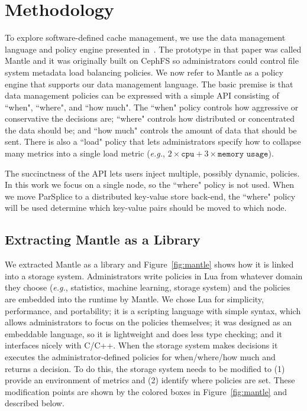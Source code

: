 \section{Methodology}

To explore software-defined cache management, we use the data management
language and policy engine presented in~\cite{sevilla:sc15-mantle}. The
prototype in that paper was called Mantle and it was originally built on CephFS
so administrators could control file system metadata load balancing policies.
We now refer to Mantle as a policy engine that supports our data management
language.  The basic premise is that data management policies can be expressed
with a simple API consisting of ``when", ``where", and ``how much". The ``when" policy
controls how aggressive or conservative the decisions are; ``where" controls
how distributed or concentrated the data should be; and ``how much" controls
the amount of data that should be sent. There is also a ``load" policy that
lets administrators specify how to collapse many metrics into a single load
metric ({\it e.g.}, \(2\times\texttt{cpu} + 3\times\texttt{memory usage}\)).

The succinctness of the API lets users inject multiple, possibly dynamic, policies. In
this work we focus on a single node, so the ``where" policy is not used. When
we move ParSplice to a distributed key-value store back-end, the ``where" policy
will be used determine which key-value pairs should be moved to which node.

\subsection{Extracting Mantle as a Library}
\label{sec:extracting}

We extracted Mantle as a library and Figure~\ref{fig:mantle} shows how it is
linked into a storage system.  Administrators write policies in Lua from whatever
domain they choose ({\it e.g.}, statistics, machine learning, storage system)
and the policies are embedded into the runtime by Mantle.  We chose Lua for
simplicity, performance, and portability; it is a scripting language with
simple syntax, which allows administrators to focus on the policies themselves;
it was designed as an embeddable language, so it is lightweight and does less
type checking; and it interfaces nicely with C/C++.  When the storage system makes
decisions it executes the administrator-defined policies for when/where/how
much and returns a decision.  To do this, the storage system needs to be modified to
(1) provide an environment of metrics and (2) identify where policies are set.
These modification points are shown by the colored boxes in
Figure~\ref{fig:mantle} and described below.

